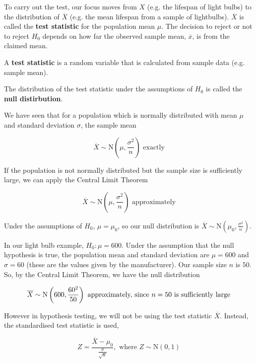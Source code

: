 \documentclass[11pt,a4paper]{book}
\begin{document}
To carry out the test, our focus moves from $X$ (e.g. the lifespan
of light bulbs) to the distribution of $\overline{X}$ (e.g. the mean
lifespan from a sample of lightbulbs). $\overline{X}$ is called the
\textbf{test statistic} for the population mean $\mu$. The decision
to reject or not to reject $H_{0}$ depends on how far the observed
sample mean, $\overline{x}$, is from the claimed mean. 

\begin{tcolorbox}[colback=blue!5, colframe=black, boxrule=.4pt, sharpish corners]

A \textbf{test statistic} is a random variable that is calculated
from sample data (e.g. sample mean).

\medskip

The distribution of the test statistic under the assumptions of $H_{0}$
is called the \textbf{null distirbution}.
\end{tcolorbox}

We have seen that for a population which is normally distributed with
mean $\mu$ and standard deviation $\sigma$, the sample mean 

\[
\overline{X}\sim\text{N}\left(\mu,\frac{\sigma^{2}}{n}\right)\text{ exactly}
\]

If the population is not normally distributed but the sample size
is sufficiently large, we can apply the Central Limit Theorem 

\[
\overline{X}\sim\text{N}\left(\mu,\frac{\sigma^{2}}{n}\right)\text{ approximately}
\]

Under the assumptions of $H_{0}$, $\mu=\mu_{0}$, so our null distribution
is ${\displaystyle \overline{X}\sim\text{N}\left(\mu_{0},\frac{\sigma^{2}}{n}\right)}$. 

In our light bulb example, $H_{0}:\mu=600$. Under the assumption
that the null hypothesis is true, the population mean and standard
deviation are $\mu=600$ and $\sigma=60$ (these are the values given
by the manufacturer). Our sample size $n$ is $50$. So, by the Central
Limit Theorem, we have the null distribution

\[
\overline{X}\sim\text{N}\left(600,\frac{60^{2}}{50}\right)\text{ approximately, since \ensuremath{n=50} is sufficiently large}
\]

However in hypothesis testing, we will not be using the test statistic
$\overline{X}$. Instead, the standardised test statistic is used, 

\[
Z=\frac{\overline{X}-\mu_{0}}{\frac{\sigma}{\sqrt{n}}},\text{ where }Z\sim\text{N}\left(0,1\right)
\]
\end{document}
